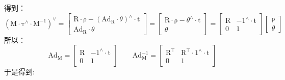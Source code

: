 \documentclass[12pt, onecolumn]{article}
\newcommand\liehat[1]{#1^{\land}}
\newcommand\lievee[1]{#1^\vee}
\newcommand\bsm[1]{\boldsymbol{\mathrm{#1}}}
\begin{document}
	得到：
	\begin{equation}
	\lievee{\left(\bsm{M}\cdot\liehat{\bsm{\tau}}\cdot\bsm{M}^{-1} \right) }=
	\begin{bmatrix}
	\bsm{R}\cdot\bsm{\rho}-\liehat{\left( \bsm{Ad}_{\bsm{R}}\cdot\theta\right) }\cdot\bsm{t}\\
	\bsm{Ad}_{\bsm{R}}\cdot\theta
	\end{bmatrix}=	\begin{bmatrix}
		\bsm{R}\cdot\bsm{\rho}-\liehat{\theta}\cdot\bsm{t}\\
		\theta
		\end{bmatrix}=\begin{bmatrix}
		\bsm{R}&-\liehat{1}\cdot\bsm{t}\\
		\bsm{0}&1
		\end{bmatrix}\begin{bmatrix}
			\bsm{\rho}\\\theta
			\end{bmatrix}
	\end{equation}
	所以：
	\begin{equation}
	\bsm{Ad}_{\bsm{M}}=\begin{bmatrix}
			\bsm{R}&-\liehat{1}\cdot\bsm{t}\\
			\bsm{0}&1
			\end{bmatrix}
	\qquad
	\bsm{Ad}_{\bsm{M}}^{-1}=\begin{bmatrix}
			 			\bsm{R}^\top&\bsm{R}^\top\cdot\liehat{1}\cdot\bsm{t}\\
			 			\bsm{0}&1
			 			\end{bmatrix}
	\end{equation}
	于是得到:
\end{document}
